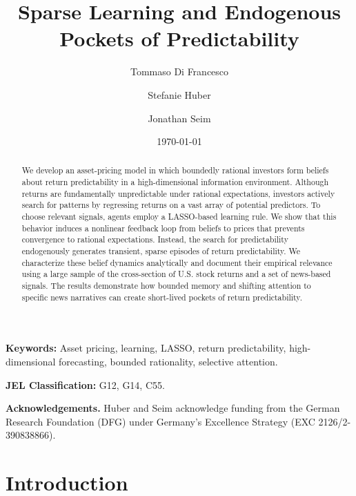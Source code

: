 \documentclass[11pt]{article}
\title{\textbf{Sparse Learning and Endogenous Pockets of Predictability}}
\author[1]{Tommaso Di Francesco}
\author[1]{Stefanie Huber}
\author[2]{Jonathan Seim}
\affil[1]{University of Bonn}
\affil[2]{University of Cologne}
\date{\today}
\begin{document}
\maketitle

\begin{abstract}
\noindent
We develop an asset-pricing model in which boundedly rational investors form beliefs about return predictability in a high-dimensional information environment. 
Although returns are fundamentally unpredictable under rational expectations, investors actively search for patterns by regressing returns on a vast array of potential predictors. 
To choose relevant signals, agents employ a LASSO-based learning rule.
We show that this behavior induces a nonlinear feedback loop from beliefs to prices that prevents convergence to rational expectations.
Instead, the search for predictability endogenously generates transient, sparse episodes of return predictability.
We characterize these belief dynamics analytically and document their empirical relevance using a large sample of the cross-section of U.S. stock returns and a set of news-based signals.
The results demonstrate how bounded memory and shifting attention to specific news narratives can create short-lived pockets of return predictability.
\end{abstract}

\vspace{0.5cm}

\noindent\textbf{Keywords:} Asset pricing, learning, LASSO, return predictability, high-dimensional forecasting, bounded rationality, selective attention. 

\noindent\textbf{JEL Classification:} G12, G14, C55.

\vspace{1.0cm}

\noindent\textbf{Acknowledgements.}
Huber and Seim acknowledge funding from the German Research Foundation (DFG) under Germany’s Excellence Strategy (EXC 2126/2-390838866).

\newpage

\section{Introduction}
\end{document}
